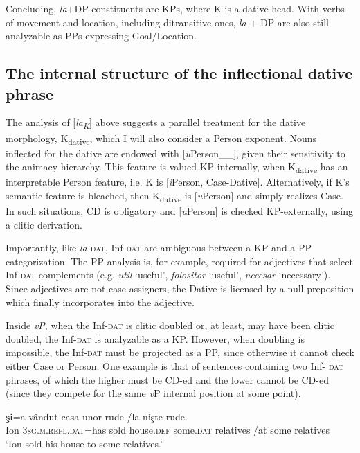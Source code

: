 \documentclass[output=paper,colorlinks,citecolor=brown,nonflat]{langsci/langscibook}
\begin{document}
Concluding, \textit{la}+DP constituents are KPs, where K is a dative head. With verbs of movement and location, including ditransitive ones, \textit{la} + DP are also still analyzable as PPs expressing Goal/Location.

\subsection{{The} {internal} {structure} {of} {the} {inflectional} {dative} {phrase}}%
\label{sec:cornilescu:2.4}

The analysis of [\textit{la\textsubscript{K}}] above suggests a parallel treatment for the dative morphology, K\textsubscript{dative}, which I will also consider a Person exponent. Nouns inflected for the dative are endowed with [\textit{u}Person\_\_], given their sensitivity to the animacy hierarchy. This feature is valued KP-internally, when K\textsubscript{dative} has an interpretable Person feature, i.e. K is [\textit{i}Person, Case-Dative{\longrule}]. Alternatively, if K’s semantic feature is bleached, then K\textsubscript{dative} is [\textit{u}Person] and simply realizes Case. In such situations, CD is obligatory and [\textit{u}Person] is checked KP-externally, using a clitic derivation.

Importantly, like \textit{la-}\textsc{dat}, Inf-\textsc{dat} are ambiguous between a KP and a PP categorization. The PP analysis is, for example, required for adjectives that select Inf-\textsc{dat} complements (e.g. \textit{util} ‘useful’, \textit{folositor} ‘useful’, \textit{necesar} ‘necessary’). Since adjectives are not case-assigners, the Dative is licensed by a null preposition which finally incorporates into the adjective.

Inside \textit{vP}, when the Inf-\textsc{dat} is clitic doubled or, at least, may have been clitic doubled, the Inf-\textsc{dat} is analyzable as a KP. However, when doubling is impossible, the Inf-\textsc{dat} must be projected as a PP, since otherwise it cannot check either Case or Person. One example is that of sentences containing two Inf- \textsc{dat} phrases, of which the higher must be CD-ed and the lower cannot be CD-ed (since they compete for the same \textit{v}P internal position at some point).

\ea%
      \label{ex:cornilescu:18}
       \textbf{{şi}}{=a} {vândut} {casa} {unor} rude /la {nişte} {rude}.\\
           Ion \textsc{3sg.m.refl}.\textsc{dat}=has sold house.\textsc{def} some.\textsc{dat} relatives /{at} some relatives \\
      \glt ‘Ion sold his house to some relatives.’
   \z
\end{document}
